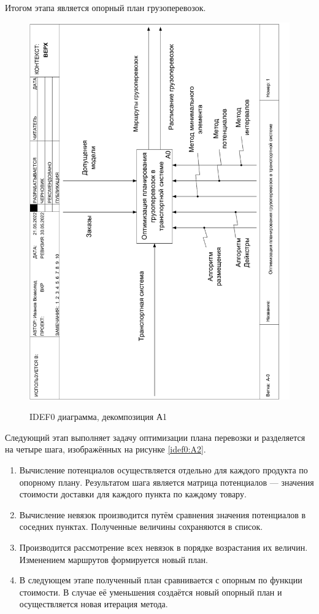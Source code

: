 Итогом этапа является опорный план грузоперевозок.

\pagebreak
\begin{figure}[h]
	\begin{center}
		{\includegraphics[scale=0.63, angle=-90, page=3]{img/idef0/idef0.pdf}}
		\caption{IDEF0 диаграмма, декомпозиция А1}
		\label{idef0:A1}
	\end{center}
\end{figure}

Следующий этап выполняет задачу оптимизации плана перевозки и разделяется на четыре шага, изображённых на рисунке \ref{idef0:A2}.
\begin{enumerate}
	\item Вычисление потенциалов осуществляется отдельно для каждого продукта по опорному плану. Результатом шага является матрица потенциалов --- значения стоимости доставки для каждого пункта по каждому товару.
	\item Вычисление невязок производится путём сравнения значения потенциалов в соседних пунктах. Полученные величины сохраняются в список.
	\item Производится рассмотрение всех невязок в порядке возрастания их величин. Изменением маршрутов формируется новый план.
	\item В следующем этапе полученный план сравнивается с опорным по функции стоимости. В случае её уменьшения создаётся новый опорный план и осуществляется новая итерация метода.
\end{enumerate}

